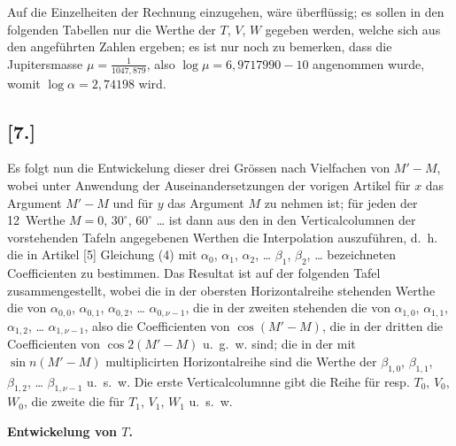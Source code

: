 \documentclass[12pt,a4paper]{article}
\begin{document}
Auf die Einzelheiten der Rechnung einzugehen, wäre überflüssig; es sollen in den folgenden Tabellen nur die Werthe der $T$, $V$, $W$ gegeben werden, welche sich aus den angeführten Zahlen ergeben; es ist nur noch zu bemerken, dass die Jupitersmasse $\mu = \frac{1}{1047,879}$, also $\log\mu = 6,9717990 - 10$ angenommen wurde, womit $\log\alpha = 2{,}74198$ wird.

\clearpage
\subsection*{[7.]}

Es folgt nun die Entwickelung dieser drei Grössen nach Vielfachen von $M'-M$, wobei unter Anwendung der Auseinandersetzungen der vorigen Artikel für $x$ das Argument $M'-M$ und für $y$ das Argument $M$ zu nehmen ist; für jeden der 12~Werthe $M = 0$, $30^{\circ}$, $60^{\circ}$ \ldots{} ist dann aus den in den Verticalcolumnen der vorstehenden Tafeln angegebenen Werthen die Interpolation auszuführen, d.~h. die in Artikel [5] Gleichung (4) mit $\alpha_0$, $\alpha_1$, $\alpha_2$, \ldots{} $\beta_1$, $\beta_2$, \ldots{} bezeichneten Coefficienten zu bestimmen. Das Resultat ist auf der folgenden Tafel zusammengestellt, wobei die in der obersten Horizontalreihe stehenden Werthe die von $\alpha_{0,0}$, $\alpha_{0,1}$, $\alpha_{0,2}$, \ldots{} $\alpha_{0,\nu-1}$, die in der zweiten stehenden die von $\alpha_{1,0}$, $\alpha_{1,1}$, $\alpha_{1,2}$, \ldots{} $\alpha_{1,\nu-1}$, also die Coefficienten von $\cos(M'-M)$, die in der dritten die Coefficienten von $\cos 2(M'-M)$ u.~g.~w. sind; die in der mit $\sin n(M'-M)$ multiplicirten Horizontalreihe sind die Werthe der $\beta_{1,0}$, $\beta_{1,1}$, $\beta_{1,2}$, \ldots{} $\beta_{1,\nu-1}$ u.~s.~w. Die erste Verticalcolumnne gibt die Reihe für resp. $T_0$, $V_0$, $W_0$, die zweite die für $T_1$, $V_1$, $W_1$ u.~s.~w.

\medskip
\textbf{Entwickelung von $T$.}
\end{document}
